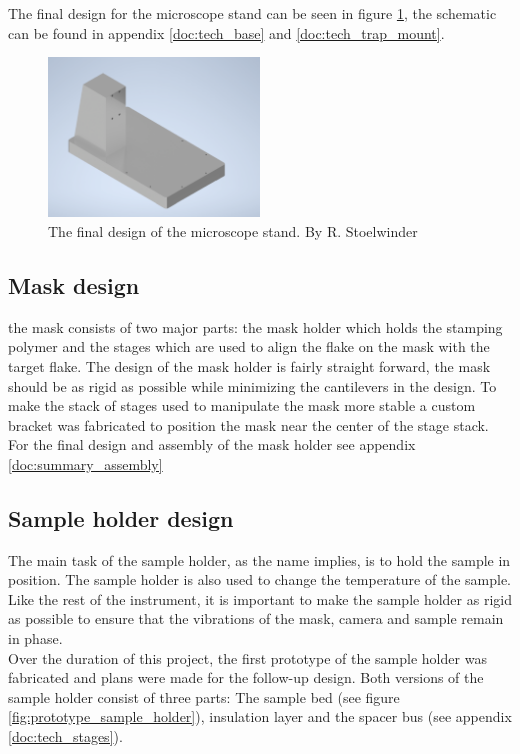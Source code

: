 \documentclass[10pt]{article}
\begin{document}
The final design for the microscope stand can be seen in figure \ref{fig:trap_stand}, the schematic can be found in appendix \ref{doc:tech_base} and \ref{doc:tech_trap_mount}.\\

\begin{figure}[htp]
  \centering
  \includegraphics[width=0.5\textwidth]{img/stand_design/microscope_stand.png}
  \caption{The final design of the microscope stand. By R. Stoelwinder}
  \label{fig:trap_stand}
\end{figure}

\clearpage
\subsection{Mask design}
the mask consists of two major parts: the mask holder which holds the stamping polymer and the stages which are used to align the flake on the mask with the target flake.
The design of the mask holder is fairly straight forward, the mask should be as rigid as possible while minimizing the cantilevers in the design.
To make the stack of stages used to manipulate the mask more stable a custom bracket was fabricated to position the mask near the center of the stage stack.
For the final design and assembly of the mask holder see appendix \ref{doc:summary_assembly}\\

\subsection{Sample holder design}
The main task of the sample holder, as the name implies, is to hold the sample in position. 
The sample holder is also used to change the temperature of the sample.
Like the rest of the instrument, it is important to make the sample holder as rigid as possible to ensure that the vibrations of the mask, camera and sample remain in phase.\\

Over the duration of this project, the first prototype of the sample holder was fabricated and plans were made for the follow-up design. 
Both versions of the sample holder consist of three parts: The sample bed (see figure \ref{fig:prototype_sample_holder}), insulation layer and the spacer bus (see appendix \ref{doc:tech_stages}).\\
\end{document}
